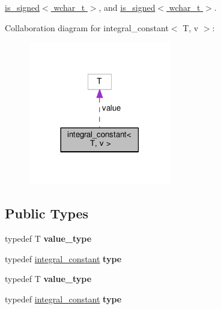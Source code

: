 \hyperlink{structis__signed_3_01wchar__t_01_4}{is\+\_\+signed$<$ wchar\+\_\+t $>$}, and \hyperlink{structis__signed_3_01wchar__t_01_4}{is\+\_\+signed$<$ wchar\+\_\+t $>$}.



Collaboration diagram for integral\+\_\+constant$<$ T, v $>$\+:
\nopagebreak
\begin{figure}[H]
\begin{center}
\leavevmode
\includegraphics[width=177pt]{structintegral__constant__coll__graph}
\end{center}
\end{figure}
\subsection*{Public Types}
\begin{DoxyCompactItemize}
\item 
typedef T {\bfseries value\+\_\+type}\hypertarget{structintegral__constant_a09382cbf2f3043d1a481eb5afcceb85e}{}\label{structintegral__constant_a09382cbf2f3043d1a481eb5afcceb85e}

\item 
typedef \hyperlink{structintegral__constant}{integral\+\_\+constant} {\bfseries type}\hypertarget{structintegral__constant_a3a7ac4a11d62e653a66a611a35e55345}{}\label{structintegral__constant_a3a7ac4a11d62e653a66a611a35e55345}

\item 
typedef T {\bfseries value\+\_\+type}\hypertarget{structintegral__constant_a09382cbf2f3043d1a481eb5afcceb85e}{}\label{structintegral__constant_a09382cbf2f3043d1a481eb5afcceb85e}

\item 
typedef \hyperlink{structintegral__constant}{integral\+\_\+constant} {\bfseries type}\hypertarget{structintegral__constant_a3a7ac4a11d62e653a66a611a35e55345}{}\label{structintegral__constant_a3a7ac4a11d62e653a66a611a35e55345}

\end{DoxyCompactItemize}
